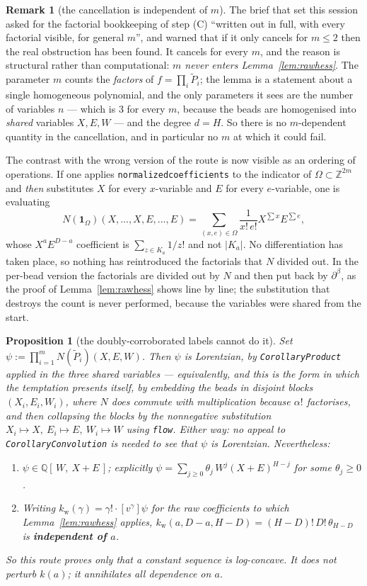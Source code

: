 \documentclass[11pt]{article}
\theoremstyle{plain}
\newtheorem{proposition}[theorem]{Proposition}
\theoremstyle{definition}
\newtheorem{remark}[theorem]{Remark}
\newcommand{\Z}{\mathbb{Z}}
\newcommand{\Pt}{\widetilde P}
\begin{document}
\begin{remark}[the cancellation is independent of $m$]\label{rem:factorials}
The brief that set this session asked for the factorial bookkeeping of step (C)
``written out in full, with every factorial visible, for general $m$'', and warned that if
it only cancels for $m\le2$ then the real obstruction has been found. It cancels for every
$m$, and the reason is structural rather than computational: \emph{$m$ never enters
Lemma~\ref{lem:rawhess}}. The parameter $m$ counts the \emph{factors} of
$f=\prod_i\Pt_i$; the lemma is a statement about a single homogeneous polynomial, and the
only parameters it sees are the number of variables $n$ --- which is $3$ for every $m$,
because the beads are homogenised into \emph{shared} variables $X,E,W$ --- and the degree
$d=H$. So there is no $m$-dependent quantity in the cancellation, and in particular no
$m$ at which it could fail.

The contrast with the wrong version of the route is now visible as an ordering of
operations. If one applies \texttt{normalizedcoefficients} to the indicator of
$\Omega\subset\Z^{2m}$ and \emph{then} substitutes $X$ for every $x$-variable and $E$ for
every $e$-variable, one is evaluating
\[
  N(\mathbf1_\Omega)(X,\dots,X,E,\dots,E)=\sum_{(x,e)\in\Omega}\frac{1}{x!\,e!}X^{\sum x}E^{\sum e},
\]
whose $X^aE^{D-a}$ coefficient is $\sum_{z\in K_a}1/z!$ and not $|K_a|$. No
differentiation has taken place, so nothing has reintroduced the factorials that $N$
divided out. In the per-bead version the factorials are divided out by $N$ and then put
back by $\partial^\beta$, as the proof of Lemma~\ref{lem:rawhess} shows line by line; the
substitution that destroys the count is never performed, because the variables were shared
from the start.
\end{remark}

\begin{proposition}[the doubly-corroborated labels cannot do it]\label{prop:vacuous}
Set $\psi:=\prod_{i=1}^mN(\Pt_i)(X,E,W)$. Then $\psi$ is Lorentzian, by
\texttt{CorollaryProduct} applied in the three shared variables --- equivalently, and this
is the form in which the temptation presents itself, by embedding the beads in disjoint
blocks $(X_i,E_i,W_i)$, where $N$ \emph{does} commute with multiplication because $\alpha!$
factorises, and then collapsing the blocks by the nonnegative substitution
$X_i\mapsto X,\ E_i\mapsto E,\ W_i\mapsto W$ using \texttt{flow}. Either way: no appeal to
\texttt{CorollaryConvolution} is needed to see that $\psi$ is Lorentzian. Nevertheless:
\begin{enumerate}
\item[(a)] $\psi\in\mathbb Q[\,W,\ X+E\,]$; explicitly
$\psi=\sum_{j\ge0}\theta_j\,W^j(X+E)^{H-j}$ for some $\theta_j\ge0$.
\item[(b)] Writing $k_{\mathrm w}(\gamma)=\gamma!\cdot[v^\gamma]\psi$ for the raw
coefficients to which Lemma~\ref{lem:rawhess} applies, $k_{\mathrm w}(a,D-a,H-D)=(H-D)!\,D!\,\theta_{H-D}$
is \textbf{independent of $a$}.
\end{enumerate}
So this route proves only that a constant sequence is log-concave. It does not perturb
$k(a)$; it annihilates all dependence on $a$.
\end{proposition}
\end{document}
